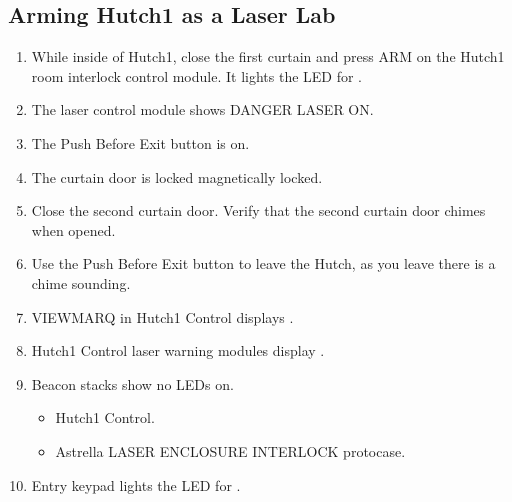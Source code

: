 \documentclass[letterpaper,10pt,english]{sphinxmanual}
\begin{document}
\subsection{Arming Hutch\sphinxhyphen{}1 as a Laser Lab}
\label{\detokenize{testing_documentation/Hutch-1_laser:arming-hutch-1-as-a-laser-lab}}\begin{enumerate}
%
\item {} 
\sphinxAtStartPar
While inside of Hutch\sphinxhyphen{}1, close the first curtain and press ARM on the Hutch\sphinxhyphen{}1 room interlock control module. It lights the LED for .

\item {} 
\sphinxAtStartPar
The laser control module shows DANGER LASER ON.

\item {} 
\sphinxAtStartPar
The Push Before Exit button is on.

\item {} 
\sphinxAtStartPar
The curtain door is locked magnetically locked.

\item {} 
\sphinxAtStartPar
Close the second curtain door. Verify that the second curtain door chimes when opened.

\item {} 
\sphinxAtStartPar
Use the Push Before Exit button to leave the Hutch, as you leave there is a chime sounding.

\item {} 
\sphinxAtStartPar
VIEWMARQ in Hutch\sphinxhyphen{}1 Control displays .

\item {} 
\sphinxAtStartPar
Hutch\sphinxhyphen{}1 Control laser warning modules display .

\item {} 
\sphinxAtStartPar
Beacon stacks show no LEDs on.
\begin{itemize}
\item {} 
\sphinxAtStartPar
Hutch\sphinxhyphen{}1 Control.

\item {} 
\sphinxAtStartPar
Astrella LASER ENCLOSURE INTERLOCK protocase.

\end{itemize}

\item {} 
\sphinxAtStartPar
Entry keypad lights the LED for .


\end{enumerate}
\end{document}
